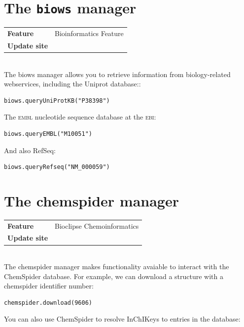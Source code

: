 \documentclass[a5paper, 10pt]{memoir}
\begin{document}
\begin{refsection}

\section{The \texttt{biows} manager}

\begin{tabular}{ll}
\textbf{Feature} & Bioinformatics Feature \\
\textbf{Update site} & \url{} \\
\end{tabular} \\

\noindent
The biows manager allows you to retrieve information from biology-related
webservices, including the Uniprot
database::

\begin{Verbatim}
biows.queryUniProtKB("P38398")
\end{Verbatim}
The \textsc{embl} nucleotide sequence database at the \textsc{ebi}:

\begin{Verbatim}
biows.queryEMBL("M10051")
\end{Verbatim}
And also RefSeq:

\begin{Verbatim}
biows.queryRefseq("NM_000059")
\end{Verbatim}

\section{The chemspider manager}

\begin{tabular}{ll}
\textbf{Feature} & Bioclipse Chemoinformatics \\
\textbf{Update site} & \url{} \\
\end{tabular} \\

\noindent
The chemspider manager makes functionality avaiable to interact with the
ChemSpider database. For example, we can download a structure
with a chemspider identifier number:

\begin{Verbatim}
chemspider.download(9606)
\end{Verbatim}
You can also use ChemSpider to resolve InChIKeys to entries in the
database:


\end{refsection}
\end{document}

